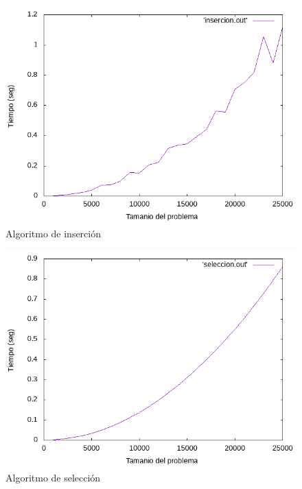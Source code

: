 \documentclass[12pt,spanish]{article}
\begin{document}
\begin{figure}[H]
\centering
\includegraphics[scale=0.75]{empirica_insercion.png}
\caption{Algoritmo de inserción}
\end{figure}

\begin{figure}[H]
\centering
\includegraphics[scale=0.75]{empirica_seleccion.png}
\caption{Algoritmo de selección}
\end{figure}
\end{document}
